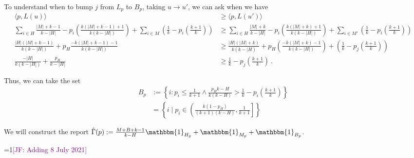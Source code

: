 \documentclass[12pt]{article}
\newcommand{\Comments}{1}
\newcommand{\mynote}[2]{\ifnum\Comments=1\textcolor{#1}{#2}\fi}
\newcommand{\jessie}[1]{\mynote{purple}{[JF: #1]}}
\newcommand{\simplex}{\Delta_\Y}
\newcommand{\Y}{\mathcal{Y}}
\newcommand{\inprod}[2]{\langle #1, #2 \rangle}%
\newcommand{\ones}{\mathbbm{1}}
\begin{document}
To understand when to bump $j$ from $L_p$ to $B_p$, taking $u \to u'$, we can ask when we have
\begin{align*}
\inprod{p}{L(u)} &\geq \inprod{p}{L(u')}\\
\sum_{i \in H} \frac{|M| + k -1}{k-|H|} - p_i \left(\frac{k(|M| + k -1)+ 1}{k(k- |H|)}\right) + \sum_{i \in M} \left(\frac 1 k - p_i \left( \frac {k+1}{k}\right)\right) &\geq \sum_{i \in H} \frac{|M| + k }{k-|H|} - p_i \left(\frac{k(|M| + k)+ 1}{k(k- |H|)}\right) + \sum_{i \in M'} \left(\frac 1 k - p_i \left( \frac {k+1}{k}\right)\right)\\
\frac{|H|(|M| + k - 1)}{k(k- |H|)} + p_H \frac{-k(|M| + k - 1) - 1}{k(k - |H|)} &\geq \frac{|H|(|M| + k)}{k(k - |H)} + p_H \left(\frac{-k(|M| + k)-1}{k (k - |H|)}\right) + \left(\frac 1 k - p_j \left(\frac {k+1}{k}\right)\right) \\
\frac{-|H|}{k (k - |H|)} + \frac{p_H}{k - |H|} &\geq \frac 1 k - p_j \left(\frac{k+1}{k}\right)~.~
\end{align*}

Thus, we can take the set 
\begin{align*}
B_p &:= \left\{i : p_i \leq \frac{1}{k+1} \wedge \frac{p_H k- H}{k(k- H)} > \frac 1 k - p_i\left(\frac{k+1}{k}\right) \right\}\\
&=\left\{i \mid p_i \in \left(\frac {k(1-p_H)}{(k+1)(k-H)}, \frac 1 {k+1} \right]\right\}
\end{align*}


We will construct the report $\hat \Gamma(p) := \frac{M + B + k - 1}{k-H}\ones_{H_p} + \ones_{M_p} + \ones_{B_p}$.


\jessie{Adding 8 July 2021}
\end{document}
